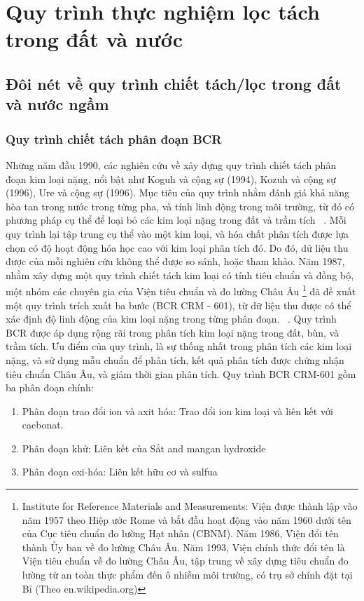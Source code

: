 ﻿\setcounter{chapter}{1}
%  
\chapter{Quy trình thực nghiệm lọc tách  trong đất và nước}

\section{Đôi nét về  quy trình chiết tách/lọc  trong đất và nước ngầm}

    \subsection{Quy trình chiết tách phân đoạn BCR}

    Những năm đầu 1990, các nghiên cứu về xây dựng quy trình chiết tách phân đoạn kim loại nặng, nổi bật như Koguh và cộng sự (1994), Kozuh  và cộng sự (1996), Ure và cộng sự (1996). Mục tiêu của quy trình nhằm đánh giá khả năng hòa tan trong nước trong từng pha, và tính linh động trong môi trường, từ đó có phương pháp cụ thể để loại bỏ các kim loại nặng trong đất và trầm tích ~\cite{BCR:OrginNusa}. Mỗi quy trình lại tập trung cụ thể vào một kim loại, và hóa chất phân tích được lựa chọn có độ hoạt động hóa học cao với kim loại phân tích đó. Do đó, dữ liệu thu được của mỗi nghiên cứu không thể được so sánh, hoặc tham khảo. Năm 1987, nhằm xây dựng một quy trình chiết tách kim loại có tính tiêu chuẩn và đồng bộ, một nhóm các chuyên gia của Viện tiêu chuẩn và đo lường Châu Âu \footnote{Institute for Reference Materials and Measurements: Viện được thành lập vào năm 1957 theo Hiệp ước Rome và bắt đầu hoạt động vào năm 1960 dưới tên của Cục tiêu chuẩn đo lường Hạt nhân (CBNM). Năm 1986, Viện đổi tên thành Ủy ban về đo lường Châu Âu. Năm 1993, Viện chính thức đổi tên là Viện tiêu chuẩn về đo lường Châu Âu, tập trung về xây dựng tiêu chuẩn đo lường từ an toàn thực phẩm đến ô nhiễm môi trường, có trụ sở chính đặt tại Bỉ (Theo en.wikipedia.org)} đã đề xuất một quy trình trích xuất ba bước (BCR CRM - 601), từ dữ liệu thu được có thể xác định độ linh động của kim loại nặng  trong từng phân đoạn. ~\cite{BCR:PeterSvete}.  Quy trình BCR được áp dụng rộng rãi trong phân tích kim loại nặng trong đất, bùn, và trầm tích. Ưu điểm của quy trình, là sự thống nhất trong phân tích các kim loại nặng, và sử dụng mẫu chuẩn để phân tích, kết quả phân tích được chứng nhận tiêu chuẩn Châu Âu, và giảm thời gian phân tích. Quy trình BCR CRM-601 gồm ba phân đoạn chính:
        \begin{enumerate}[label=(\arabic*) ]
            \item Phân đoạn trao đổi ion và axit hóa: Trao đổi ion kim loại và liên kết với cacbonat.
            \item Phân đoạn khử: Liên kết của Sắt and mangan hydroxide
            \item Phân đoạn oxi-hóa: Liên kết hữu cơ và sulfua
        \end{enumerate}


